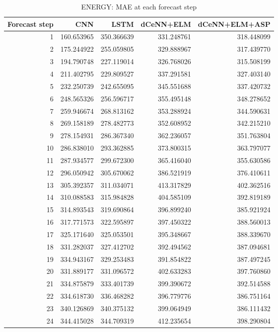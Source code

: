 \begin{table}
\caption{ENERGY: MAE at each forecast step}
\begin{tabular}{rrrrr}
\toprule
Forecast step & CNN & LSTM & dCeNN+ELM & dCeNN+ELM+ASP \\
\midrule
1 & 160.653965 & 350.366639 & 331.248761 & 318.448099 \\
2 & 175.244922 & 255.059805 & 329.888967 & 317.439770 \\
3 & 194.790748 & 227.119014 & 326.768026 & 315.508199 \\
4 & 211.402795 & 229.809527 & 337.291581 & 327.403140 \\
5 & 232.250739 & 242.655095 & 345.551688 & 337.420732 \\
6 & 248.565326 & 256.596717 & 355.495148 & 348.278652 \\
7 & 259.946674 & 268.813162 & 353.288924 & 344.590631 \\
8 & 269.158189 & 278.482773 & 352.608952 & 342.215210 \\
9 & 278.154931 & 286.367340 & 362.236057 & 351.763804 \\
10 & 286.838010 & 293.362885 & 373.800315 & 363.797077 \\
11 & 287.934577 & 299.672300 & 365.416040 & 355.630586 \\
12 & 296.050942 & 305.670062 & 386.521919 & 376.410611 \\
13 & 305.392357 & 311.034071 & 413.317829 & 402.362516 \\
14 & 310.088583 & 315.984828 & 404.585109 & 392.819189 \\
15 & 314.893543 & 319.690864 & 396.899240 & 385.921924 \\
16 & 317.771573 & 322.595897 & 397.450322 & 388.560013 \\
17 & 325.171640 & 325.053501 & 395.348667 & 388.339670 \\
18 & 331.282037 & 327.412702 & 392.494562 & 387.094681 \\
19 & 334.943167 & 329.253483 & 391.854822 & 387.497245 \\
20 & 331.889177 & 331.096572 & 402.633283 & 397.760860 \\
21 & 334.875879 & 333.401739 & 399.390672 & 392.514588 \\
22 & 334.618730 & 336.468282 & 396.779776 & 386.751164 \\
23 & 340.126869 & 340.375132 & 399.064949 & 386.111432 \\
24 & 344.415028 & 344.709319 & 412.235654 & 398.290804 \\

\end{tabular}
\end{table}
